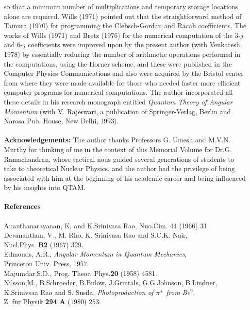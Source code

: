 so that a minimum number of multiplications and temporary storage locations alone 
are required. Wills (1971) pointed out that the straightforward method of Tamura (1970) 
for programming the Clebsch-Gordan and Racah coefficients. The works of Wills (1971) and 
Bretz (1976) for the numerical computation of the 3-$j$ and 6-$j$ coefficients were
improved upon by the present author (with Venkatesh, 1978) by essentially reducing the 
number of arithmetic operations performed in the computations, using the Horner scheme,
and these were published in the Computer Physics Communications and also were acquired
by the Bristol center from where they were made available for those who needed faster
more efficient computer programs for numerical computations. The author incorporated 
all these details in his research monograph entitled \textit{Quantum Theory of Angular
Momentum} (with V. Rajeswari, a publication of Springer-Verlag, Berlin and Narosa Pub. 
House, New Delhi, 1993).\\ \\
 {\bf Acknowledgements:} The author thanks Professors G. Umesh and M.V.N. Murthy 
for thinking of me in the context of this Memorial Volume for Dr.G. Ramachandran, 
whose tactical nous guided several generations of students to take to theoretical 
Nuclear Physics, and the author had the privilege of being associated with him at 
the beginning of his academic career and being influenced by his insights into QTAM.\\ \\
 {\bf References}\\ \\
Ananthanarayanan, K. and K.Srinivasa Rao, Nuo.Cim. 44 (1966) 31. \\
Devananthan, V., M. Rho, K. Srinivasa Rao and S.C.K. Nair,\\
\indent  Nucl.Phys. {\bf B2} (1967) 329. \\
Edmonds, A.R., \textit{Angular Momentum in Quantum Mechanics}, \\
\indent Princeton Univ. Press, 1957.\\
Majumdar,S.D., Prog. Theor. Phys.{\bf 20} (1958) 4581.\\ 
Nilsson,M., B.Schroeder, B.Bulow, J.Grintals, G.G.Johnson, B.Lindner,\\
\indent  K.Srinivsaa Rao and S. Susila, \textit{Photoproduction of $\pi^+$ from Be$^9$},\\
\indent Z. f\"{u}r Physik {\bf 294 A} (1980) 253. \\
